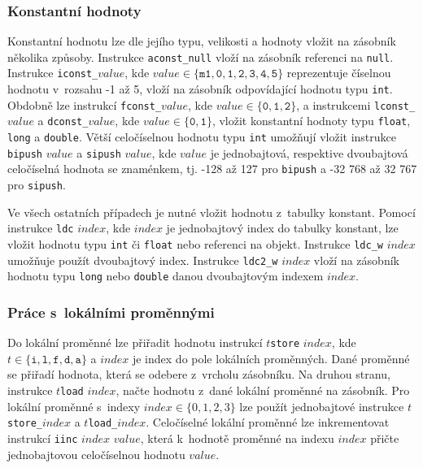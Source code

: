 \subsubsection{Konstantní hodnoty}

Konstantní hodnotu lze dle jejího typu, velikosti a hodnoty vložit na zásobník několika způsoby.
Instrukce \texttt{aconst\_null} vloží na zásobník referenci na \texttt{null}. 
Instrukce \texttt{iconst\_}$value$, kde $value \in \{ \texttt{m1}, \texttt{0}, \texttt{1}, \texttt{2}, \texttt{3}, \texttt{4}, \texttt{5}\}$ reprezentuje číselnou hodnotu v~rozsahu -1 až 5, vloží na zásobník odpovídající hodnotu typu \texttt{int}. Obdobně lze instrukcí \texttt{fconst\_}$value$, kde $value \in \{\texttt{0}, \texttt{1}, \texttt{2}\}$, a instrukcemi \texttt{lconst\_}$value$ a \texttt{dconst\_}$value$, kde $value \in \{\texttt{0}, \texttt{1}\}$, vložit konstantní hodnoty typu \texttt{float}, \texttt{long} a \texttt{double}. 
Větší celočíselnou hodnotu typu \texttt{int} umožňují vložit instrukce \texttt{bipush} $value$ a \texttt{sipush} $value$, kde $value$ je jednobajtová, respektive dvoubajtová celočíselná hodnota se znaménkem, tj. -128 až 127 pro \texttt{bipush} a -32 768 až 32 767 pro \texttt{sipush}.

Ve všech ostatních případech je nutné vložit hodnotu z~tabulky konstant. Pomocí instrukce \texttt{ldc} $index$, kde $index$ je jednobajtový index do tabulky konstant, lze vložit hodnotu typu \texttt{int} či \texttt{float} nebo referenci na objekt. Instrukce \texttt{ldc\_w} $index$ umožňuje použít dvoubajtový index. Instrukce \texttt{ldc2\_w} $index$ vloží na zásobník hodnotu typu \texttt{long} nebo \texttt{double} danou dvoubajtovým indexem  $index$.

\subsubsection{Práce s~lokálními proměnnými}

Do lokální proměnné lze přiřadit hodnotu instrukcí $t$\texttt{store} $index$, kde $t \in \{ \texttt{i}, \texttt{l}, \texttt{f}, \texttt{d}, \texttt{a} \}$ a $index$ je index do pole lokálních proměnných. Dané proměnné se přiřadí hodnota, která se odebere z~vrcholu zásobníku. Na druhou stranu, instrukce $t$\texttt{load} $index$, načte hodnotu z~dané lokální proměnné na zásobník. Pro lokální proměnné s~indexy $index \in \{0,1,2,3\}$ lze použít jednobajtové instrukce $t$\texttt{store\_}$index$ a $t$\texttt{load\_}$index$.
Celočíselné lokální proměnné lze inkrementovat instrukcí \texttt{iinc} $index$ $value$, která k~hodnotě proměnné na indexu $index$ přičte jednobajtovou celočíselnou hodnotu $value$.

